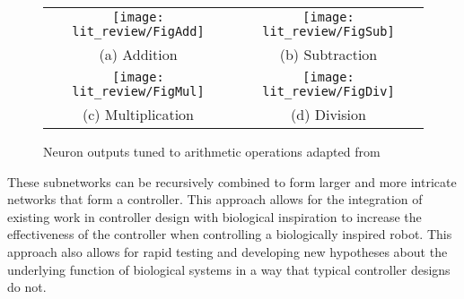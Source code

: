
\begin{figure}
\centering
\begin{tabular}{cc}
\texttt{[image: lit\_review/FigAdd]} &
\texttt{[image: lit\_review/FigSub]} \\
(a) Addition & (b) Subtraction \\
\texttt{[image: lit\_review/FigMul]} &
\texttt{[image: lit\_review/FigDiv]} \\
(c) Multiplication & (d) Division \\
\end{tabular}
\caption{Neuron outputs tuned to arithmetic operations adapted from \cite{NickFunctionalSubnetwork}}
\label{fig:MathOutputs}
\end{figure}

These subnetworks can be recursively combined to form larger and more intricate
networks that form a controller. This approach allows for the integration of
existing work in controller design with biological inspiration to increase the
effectiveness of the controller when controlling a biologically inspired robot.
This approach also allows for rapid testing and developing new hypotheses about the underlying function of biological systems in a way that typical controller designs do not.

